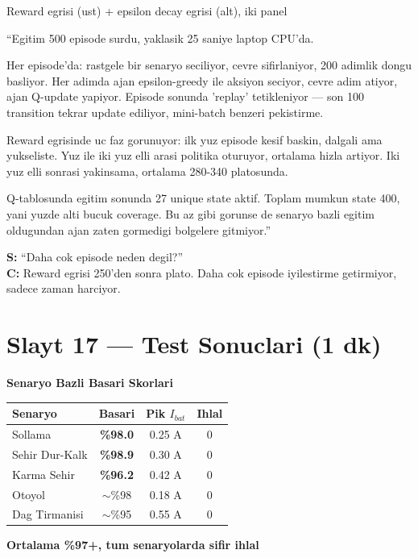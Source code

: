 \documentclass[11pt,a4paper]{article}
\begin{document}
\begin{gorselboks}
Reward egrisi (ust) + epsilon decay egrisi (alt), iki panel
\end{gorselboks}

\begin{sayboks}
``Egitim 500 episode surdu, yaklasik 25 saniye laptop CPU'da.

Her episode'da: rastgele bir senaryo seciliyor, cevre sifirlaniyor, 200 adimlik dongu basliyor. Her adimda ajan epsilon-greedy ile aksiyon seciyor, cevre adim atiyor, ajan Q-update yapiyor. Episode sonunda 'replay' tetikleniyor --- son 100 transition tekrar update ediliyor, mini-batch benzeri pekistirme.

Reward egrisinde uc faz gorunuyor: ilk yuz episode kesif baskin, dalgali ama yukseliste. Yuz ile iki yuz elli arasi politika oturuyor, ortalama hizla artiyor. Iki yuz elli sonrasi yakinsama, ortalama 280-340 platosunda.

Q-tablosunda egitim sonunda 27 unique state aktif. Toplam mumkun state 400, yani yuzde alti bucuk coverage. Bu az gibi gorunse de senaryo bazli egitim oldugundan ajan zaten gormedigi bolgelere gitmiyor.''
\end{sayboks}

\begin{soruboks}
\textbf{S:} ``Daha cok episode neden degil?''\\
\textbf{C:} Reward egrisi 250'den sonra plato. Daha cok episode iyilestirme getirmiyor, sadece zaman harciyor.
\end{soruboks}

\section{Slayt 17 --- Test Sonuclari (1 dk)}

\begin{slytboks}
\textbf{Senaryo Bazli Basari Skorlari}
\begin{center}
\begin{tabular}{lccc}
\toprule
Senaryo & Basari & Pik $I_{bat}$ & Ihlal \\
\midrule
Sollama        & \textbf{\%98.0} & 0.25 A & 0 \\
Sehir Dur-Kalk & \textbf{\%98.9} & 0.30 A & 0 \\
Karma Sehir    & \textbf{\%96.2} & 0.42 A & 0 \\
Otoyol         & $\sim$\%98 & 0.18 A & 0 \\
Dag Tirmanisi  & $\sim$\%95 & 0.55 A & 0 \\
\bottomrule
\end{tabular}
\end{center}
\textbf{Ortalama \%97+, tum senaryolarda sifir ihlal}
\end{slytboks}
\end{document}
